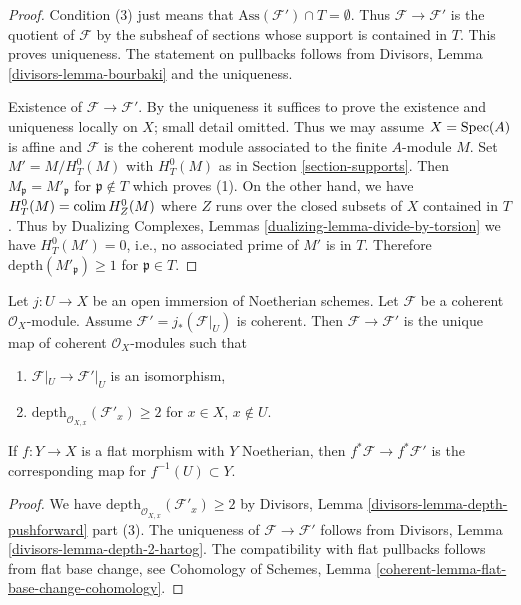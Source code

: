 \begin{proof}
Condition (3) just means that $\text{Ass}(\mathcal{F}') \cap T = \emptyset$.
Thus $\mathcal{F} \to \mathcal{F}'$ is the quotient of $\mathcal{F}$
by the subsheaf of sections whose support is contained in $T$.
This proves uniqueness. The statement on pullbacks follows from
Divisors, Lemma \ref{divisors-lemma-bourbaki}
and the uniqueness.

\medskip\noindent
Existence of $\mathcal{F} \to \mathcal{F}'$.
By the uniqueness it suffices to prove the
existence and uniqueness locally on $X$; small detail omitted.
Thus we may assume $X = \mathop{\mathrm{Spec}}(A)$ is affine and $\mathcal{F}$
is the coherent module associated to the finite $A$-module $M$.
Set $M' = M / H^0_T(M)$ with $H^0_T(M)$ as in Section \ref{section-supports}.
Then $M_\mathfrak p = M'_\mathfrak p$ for $\mathfrak p \not \in T$
which proves (1). On the other hand, we have
$H^0_T(M) = \mathop{\mathrm{colim}}\nolimits H^0_Z(M)$ where $Z$ runs over the closed
subsets of $X$ contained in $T$. Thus by
Dualizing Complexes, Lemmas \ref{dualizing-lemma-divide-by-torsion}
we have $H^0_T(M') = 0$, i.e., no associated prime
of $M'$ is in $T$. Therefore $\text{depth}(M'_\mathfrak p) \geq 1$
for $\mathfrak p \in T$.
\end{proof}

\begin{lemma}
\label{lemma-get-depth-2-along-Z}
Let $j : U \to X$ be an open immersion of Noetherian schemes.
Let $\mathcal{F}$ be a coherent $\mathcal{O}_X$-module.
Assume $\mathcal{F}' = j_*(\mathcal{F}|_U)$ is coherent.
Then $\mathcal{F} \to \mathcal{F}'$ is the unique map
of coherent $\mathcal{O}_X$-modules such that
\begin{enumerate}
\item $\mathcal{F}|_U \to \mathcal{F}'|_U$
is an isomorphism,
\item $\text{depth}_{\mathcal{O}_{X, x}}(\mathcal{F}'_x) \geq 2$
for $x \in X$, $x \not \in U$.
\end{enumerate}
If $f : Y \to X$ is a flat morphism with $Y$ Noetherian, then
$f^*\mathcal{F} \to f^*\mathcal{F}'$ is the corresponding
map for $f^{-1}(U) \subset Y$.
\end{lemma}

\begin{proof}
We have $\text{depth}_{\mathcal{O}_{X, x}}(\mathcal{F}'_x) \geq 2$
by Divisors, Lemma \ref{divisors-lemma-depth-pushforward} part (3).
The uniqueness of $\mathcal{F} \to \mathcal{F}'$ follows from
Divisors, Lemma \ref{divisors-lemma-depth-2-hartog}.
The compatibility with flat pullbacks follows from
flat base change, see Cohomology of Schemes, Lemma
\ref{coherent-lemma-flat-base-change-cohomology}.
\end{proof}

